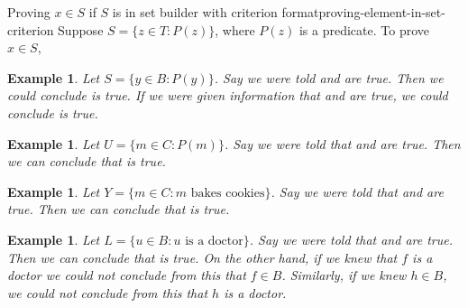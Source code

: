 \documentclass{book}
\newcounter{ekcounter}%
\theoremstyle{ekimcustom}
\newtheorem{example}[ekcounter]{Example}
\begin{document}
\begin{bmethod}{Proving $x \in S$ if $S$ is in set builder with criterion format}{proving-element-in-set-criterion}
Suppose $S = \{z \in T : P(z)\}$, where $P(z)$ is a predicate. To prove $x \in S$,
\begin{center}
\end{center}
\end{bmethod}


\begin{example}
Let $S = \{y \in B : P(y)\}$. Say we were told  and  are true. Then we could conclude  is true. If we were given information that  and  are true, we could conclude  is true.
\end{example}

\begin{example}
Let $U = \{m \in C : P(m)\}$. Say we were told that  and  are true. Then we can conclude that  is true. 
\end{example}
\begin{example}
Let $Y = \{m \in C : m \text{ bakes cookies}\}$. Say we were told that  and  are true. Then we can conclude that   is true. 
\end{example}
\begin{example}
Let $L = \{u \in B : u \text{ is a doctor}\}$. Say we were told that  and  are true. Then we can conclude that  is true. On the other hand, if we knew that $f$ is a doctor we could not conclude from this that $f \in B$. Similarly, if we knew $h \in B$, we could not conclude from this that $h$ is a doctor.
\end{example}
\end{document}
